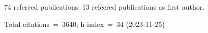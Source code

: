 74 refereed publications. 13 refeered publications as first author.

Total citations~=~3640; h-index~=~34 (2023-11-25)